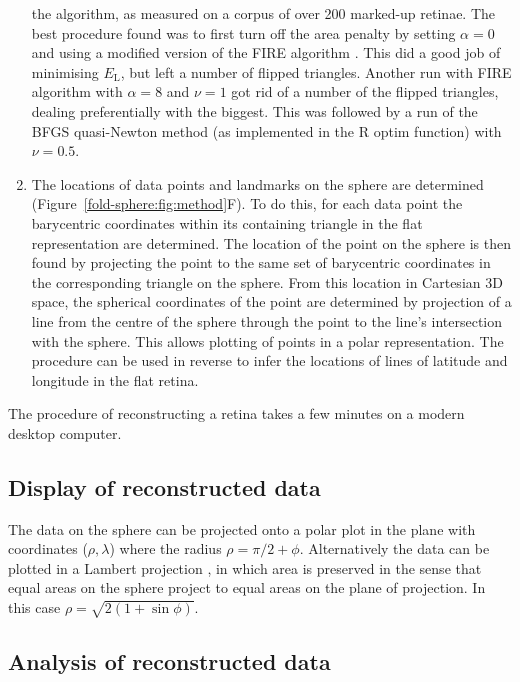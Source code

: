 \documentclass[10pt]{article}
\begin{document}
\begin{enumerate}
  the algorithm, as measured on a corpus of over 200 marked-up
  retinae. The best procedure found was to first turn off the area
  penalty by setting $\alpha=0$ and using a modified version of the
  FIRE algorithm \cite{BitzEtal06stru}. This did a good job of
  minimising $E_{\mathrm{L}}$, but left a number of flipped
  triangles. Another run with FIRE algorithm with $\alpha=8$ and
  $\nu=1$ got rid of a number of the flipped triangles, dealing
  preferentially with the biggest. This was followed by a run of the
  BFGS quasi-Newton method (as implemented in the R optim function)
  with $\nu=0.5$.
\item The locations of data points and landmarks on the sphere are
  determined (Figure~\ref{fold-sphere:fig:method}F). To do this, for
  each data point the barycentric coordinates within its containing
  triangle in the flat representation are determined.  The location of
  the point on the sphere is then found by projecting the point to the
  same set of barycentric coordinates in the corresponding triangle on
  the sphere. From this location in Cartesian 3D space, the spherical
  coordinates of the point are determined by projection of a line from
  the centre of the sphere through the point to the line's
  intersection with the sphere. This allows plotting of points in a
  polar representation. The procedure can be used in reverse to infer
  the locations of lines of latitude and longitude in the flat retina.
\end{enumerate}

The procedure of reconstructing a retina takes a few minutes on a
modern desktop computer.

\subsection*{Display of reconstructed data}
\label{retistruct_plos:sec:displ-reconstr-data}

The data on the sphere can be projected onto a polar plot in the plane
with coordinates ($\rho, \lambda$) where the radius $\rho=\pi/2 +
\phi$. Alternatively the data can be plotted in a Lambert projection
\cite{FishEtal87spat}, in which area is preserved in the sense that
equal areas on the sphere project to equal areas on the plane of
projection. In this case $\rho=\sqrt{2(1+\sin\phi)}$.

\subsection*{Analysis of reconstructed data}
\label{retistruct_plos:sec:analys-reconstr-data}
\end{document}
